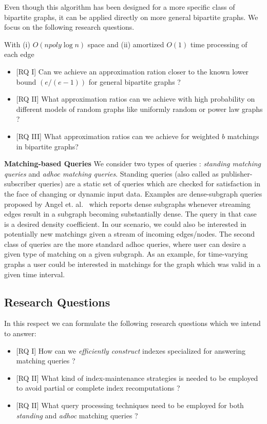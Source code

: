 Even though this algorithm has been designed for a more specific class of bipartite graphs, it can be applied directly on more general bipartite graphs. We focus on the following research questions.

With (i) $O(n poly \log n)$ space and  (ii) amortized $O(1)$ time processing of each edge
\begin{itemize}
\item  \textsf{[RQ I]} Can we achieve an approximation ration closer to the known lower bound $(e/(e-1))$ for general bipartite graphs ?
\item \textsf{[RQ II]} What approximation ratios can we achieve with high probability on different models of random graphs like uniformly random or power law graphs ?
\item \textsf{[RQ III]} What approximation ratios can we achieve for weighted $b$ matchings in bipartite graphs?

\end{itemize}



\label{wp:implementation}

\textbf{Matching-based Queries} 
We consider two types of queries : \emph{standing matching queries} and \emph{adhoc matching queries}. Standing queries (also called as publisher-subscriber queries) are a static set of queries which are checked for satisfaction in the face of changing or dynamic input data. Examples are dense-subgraph queries proposed by Angel et. al.~\cite{angel_dense_2013} which reports dense subgraphs whenever streaming edges result in a subgraph becoming substantially dense. The query in that case is a desired density coefficient. In our scenario, we could also be interested in potentially new matchings given a stream of incoming edges/nodes. The second class of queries are the more standard adhoc queries, where user can desire a given type of matching on a given subgraph. As an example, for time-varying graphs a user could be interested in matchings for the graph which was valid in a given time interval.


\subsection{Research Questions}     
In this respect we can formulate the following research questions which we intend to answer:
\begin{itemize}
    \item \textsf{[RQ I]} How can we \emph{efficiently construct} indexes specialized for answering matching queries ? 

    \item \textsf{[RQ II]} What kind of index-maintenance strategies is needed to be employed to avoid partial or complete index recomputations ?

    \item \textsf{[RQ II]} What query processing techniques need to be employed for both \emph{standing} and \emph{adhoc} matching queries ?

\end{itemize}



